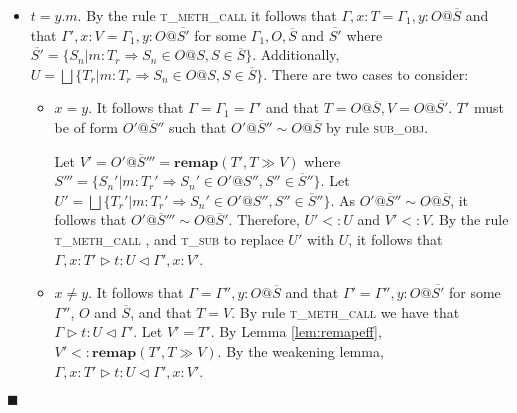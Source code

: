 \documentclass[preprint]{sigplanconf}
\newcommand{\lemref}[1]{Lemma \ref{#1}}
\newcommand{\tfunc}{\textsc{t\_fun\_call} }
\newcommand{\tmethc}{\textsc{t\_meth\_call} }
\newcommand{\tsub}{\textsc{t\_sub} }
\newcommand{\subobj}{\textsc{sub\_obj}}
\newcommand{\remapapp}[3]{\ensuremath{\mathbf{remap}(#1, #2 \gg #3)}}
\newcommand{\typerule}[4]{#1 \triangleright #2 : #3 \triangleleft #4}
\newcommand{\funt}[3]{(\overline{#1 \gg #2}) \rightarrow #3}
\newcommand{\qed}{$\blacksquare$}
\newenvironment{proof}{\vspace{1ex}\noindent{\bf Proof}\hspace{0.5em}}
  {\hfill\qed\vspace{1ex}}
\begin{document}
\begin{proof}
\begin{itemize}
\begin{itemize}
\item $x = y$, meaning $\Gamma = \Gamma_1, \overline{z_i : T_i}$ and
$\Gamma' = \Gamma_1, \overline{z_i : T_i'}$. 
Additionally, $T = V = \funt{U_i}{V_i}{U}$.
$T'$ must therefore be of form $\funt{U_i'}{V_i'}{U'}$ 
such that for each $i$, $U_i <: U_i'$, $V_i' <: V_i$, $U' <: U$ by the
definition of subtyping. Let $V' = T'$.
By \lemref{lem:remapeff}, $V' <: \remapapp{T'}{T}{V}$.
It follows by rule \tfunc, and \tsub to replace $U'$ with $U$, that
$\typerule{\Gamma, x : T'}{t}{U}{\Gamma', x : V'}$.

\item $x \in \overline{z_i}$, meaning that $T = T_i$ and 
$V = T_i' = \remapapp{T}{U_i}{V_i}$ for some $i$.
Let $V' = \remapapp{T'}{U_i}{V_i}$. 
By \lemref{lem:remapcv}, $V' <: V$.
As $T' <: T$, we can type $t$ by rule \tfunc such that
$\typerule{\Gamma, x : T'}{t}{U}{\Gamma, x : V'}$.

\end{itemize}

\item $t = y.m$. By the rule \tmethc it follows that
$\Gamma, x : T = \Gamma_1, y : O@\overline{S}$
and that
$\Gamma', x : V = \Gamma_1, y : O@\overline{S'}$
for some $\Gamma_1, O, \overline{S}$ and $\overline{S'}$
where
$\overline{S'} = \{ S_n | m : T_r \Rightarrow S_n \in O@S, S \in \overline{S} \}$.
Additionally, 
$U = \bigsqcup{ \{ T_r | m : T_r \Rightarrow S_n \in O@S, S \in \overline{S} \} }$.
There are two cases to consider:

\begin{itemize}
\item $x = y$. It follows that $\Gamma = \Gamma_1 = \Gamma'$ and
that $T = O@\overline{S}, V = O@\overline{S'}$.
$T'$ must be of form $O'@\overline{S}''$ such that
$O'@\overline{S}'' \sim O@\overline{S}$ by rule \subobj.

Let $V' = O'@\overline{S}''' = \remapapp{T'}{T}{V}$
where
$S''' = \{ S_n' | m : T_r' \Rightarrow S_n' \in O'@S'', S'' \in \overline{S}''\}$.
Let $U' = \bigsqcup{ \{ T_r' | m : T_r' \Rightarrow S_n' \in O'@S'', S'' \in \overline{S}'' \} }$.
As $O'@\overline{S}'' \sim O@\overline{S}$, it follows that
$O'@\overline{S}''' \sim O@\overline{S}'$.
Therefore, $U' <: U$ and $V' <: V$. By the rule \tmethc, and \tsub
to replace $U'$ with $U$, it follows that
$\typerule{\Gamma, x : T'}{t}{U}{\Gamma', x : V'}$.

\item $x \neq y$. It follows that $\Gamma = \Gamma'', y : O@\overline{S}$
and that $\Gamma' = \Gamma'', y : O@\overline{S'}$
for some $\Gamma''$, $O$ and $\overline{S}$, and that
$T = V$.
By rule \tmethc we have that $\typerule{\Gamma}{t}{U}{\Gamma'}$.
Let $V' = T'$. By \lemref{lem:remapeff}, $V' <: \remapapp{T'}{T}{V}$.
By the weakening lemma, 
$\typerule{\Gamma, x : T'}{t}{U}{\Gamma', x : V'}$.


\end{itemize}
\end{itemize}
\end{proof}
\end{document}

